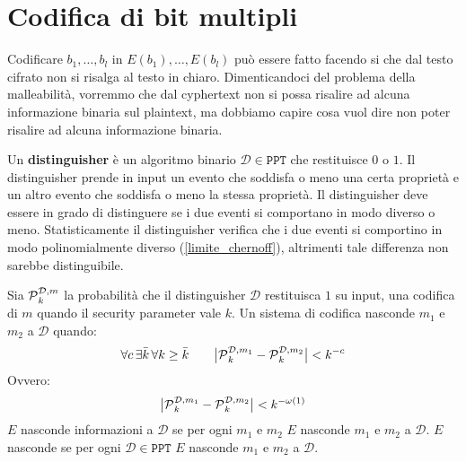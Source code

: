 \section{Codifica di bit multipli}\label{sec:distinguisher}
Codificare $b_1, \dots, b_l$ in $E(b_1), \dots, E(b_l)$ può essere fatto facendo si che dal testo cifrato non si risalga 
al testo in chiaro. Dimenticandoci del problema della malleabilità, vorremmo che dal cyphertext non si possa risalire
ad alcuna informazione binaria sul plaintext, ma dobbiamo capire cosa vuol dire non poter risalire ad alcuna informazione
binaria.
\begin{tcolorbox}[title = Distinguisher]
  Un \textbf{distinguisher} è un algoritmo binario $\mathcal{D} \in \texttt{PPT}$ che restituisce $0$ o $1$. Il distinguisher
  prende in input un evento che soddisfa o meno una certa proprietà e 
  un altro evento che soddisfa o meno la stessa proprietà. Il distinguisher deve essere in grado di distinguere
  se i due eventi si comportano in modo diverso o meno.
  Statisticamente il distinguisher verifica che i due eventi si comportino in modo polinomialmente diverso
  (\ref{limite_chernoff}), altrimenti tale differenza non sarebbe distinguibile.
\end{tcolorbox}
Sia $\text{$\mathcal{P}$}_k^{\mathcal{D}, m}$ la probabilità che il distinguisher $\mathcal{D}$ restituisca $1$ su input, una codifica 
di $m$ quando il security parameter vale $k$. Un sistema di codifica nasconde $m_1$ e $m_2$ a $\mathcal{D}$ quando:
\begin{equation}
  \forall c \, \exists \bar{k} \, \forall k \geq \bar{k} \qquad
  \big|\text{$\mathcal{P}$}_k^{\mathcal{D}, m_1} - \text{$\mathcal{P}$}_k^{\mathcal{D}, m_2}\big| < k^{-c}
\end{equation}
Ovvero:
\begin{equation}
  \big|\text{$\mathcal{P}$}_k^{\mathcal{D}, m_1} - \text{$\mathcal{P}$}_k^{\mathcal{D}, m_2}\big| < k^{-\omega(1)}
\end{equation}
$E$ nasconde informazioni a $\mathcal{D}$ se per ogni $m_1$ e $m_2$ $E$ nasconde $m_1$ e $m_2$ a $\mathcal{D}$. 
$E$ nasconde se per ogni $\mathcal{D} \in \texttt{PPT}$ $E$ nasconde $m_1$ e $m_2$ a $\mathcal{D}$.
